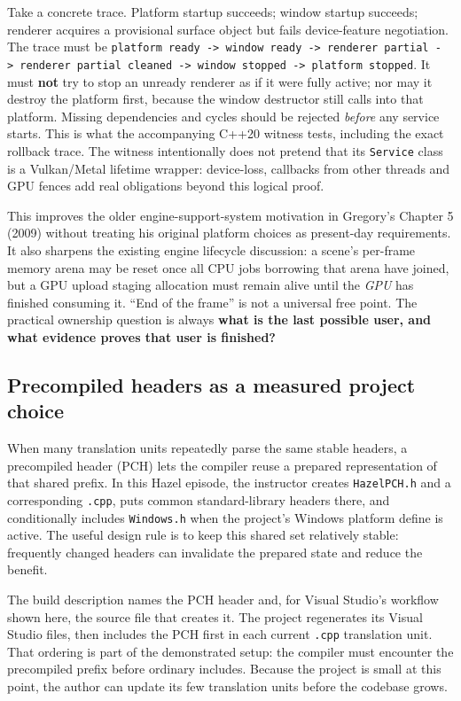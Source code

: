Take a concrete trace. Platform startup succeeds; window startup succeeds; renderer acquires a provisional surface object but fails device-feature negotiation. The trace must be \texttt{platform\ ready\ -\textgreater{}\ window\ ready\ -\textgreater{}\ renderer\ partial\ -\textgreater{}\ renderer\ partial\ cleaned\ -\textgreater{}\ window\ stopped\ -\textgreater{}\ platform\ stopped}. It must \textbf{not} try to stop an unready renderer as if it were fully active; nor may it destroy the platform first, because the window destructor still calls into that platform. Missing dependencies and cycles should be rejected \emph{before} any service starts. This is what the accompanying C++20 witness tests, including the exact rollback trace. The witness intentionally does not pretend that its \texttt{Service} class is a Vulkan/Metal lifetime wrapper: device-loss, callbacks from other threads and GPU fences add real obligations beyond this logical proof.

This improves the older engine-support-system motivation in Gregory's Chapter 5 (2009) without treating his original platform choices as present-day requirements. It also sharpens the existing engine lifecycle discussion: a scene's per-frame memory arena may be reset once all CPU jobs borrowing that arena have joined, but a GPU upload staging allocation must remain alive until the \emph{GPU} has finished consuming it. ``End of the frame'' is not a universal free point. The practical ownership question is always \textbf{what is the last possible user, and what evidence proves that user is finished?}

\subsection{Precompiled headers as a measured project choice}\label{05-engine-i-ch013-precompiled-headers-as-a-measured-project-choice}

When many translation units repeatedly parse the same stable headers, a precompiled header (PCH) lets the compiler reuse a prepared representation of that shared prefix. In this Hazel episode, the instructor creates \texttt{HazelPCH.h} and a corresponding \texttt{.cpp}, puts common standard-library headers there, and conditionally includes \texttt{Windows.h} when the project's Windows platform define is active. The useful design rule is to keep this shared set relatively stable: frequently changed headers can invalidate the prepared state and reduce the benefit.

The build description names the PCH header and, for Visual Studio's workflow shown here, the source file that creates it. The project regenerates its Visual Studio files, then includes the PCH first in each current \texttt{.cpp} translation unit. That ordering is part of the demonstrated setup: the compiler must encounter the precompiled prefix before ordinary includes. Because the project is small at this point, the author can update its few translation units before the codebase grows.

